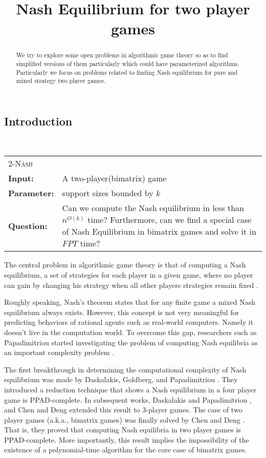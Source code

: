 \documentclass{article}
\newcommand{\defproblem}[4]{%
  \hfill\\\smallskip\noindent%
  \begin{tabularx}{\textwidth}{|l X|}%
    \hline%
    \multicolumn{2}{|l|}{\pname{#1}}\\%
    \textbf{Input:}&#2\\%
    \textbf{Parameter:}&#3\\%
    \textbf{Question:}&#4\smallskip\\\hline%
  \end{tabularx}%
  \smallskip%
}%
\newcommand{\pname}[1]{\textnormal{\textsc{#1}}}
\begin{document}
\title{Nash Equilibrium for two player games}
\date{}
\maketitle



\begin{abstract}
We try to explore some open problems in algorithmic game theory so as to find simplified versions of them particularly which could have parameterized algorithms. Particularly we focus on problems related to finding Nash equilibrium for pure and mixed strategy two player games.

\end{abstract}

\subsection*{Introduction}

\defproblem{$2$-Nash}
%
{A two-player(bimatrix) game}
%
{support sizes bounded by $k$}
%
{Can we compute the Nash equilibrium in less than $n^{O(k)}$ time? Furthermore, can we find a special case of Nash Equilibrium in bimatrix games and solve it in $FPT$ time?}
%

The central problem in algorithmic game theory is that of computing a Nash
equilibrium, a set of strategies for each player in a given game, where no player
can gain by changing his strategy when all other players strategies remain fixed \cite{hermelin2013parameterized}.

Roughly speaking, Nash's theorem states that for any finite game a mixed Nash equilibrium always exists. However, this concept is not very meaningful for predicting behaviors of rational agents such as real-world computers. Namely it doesn't live in the computation world. To overcome this gap, researchers such as Papadimitriou started investigating the problem of computing Nash equilibria as an important complexity problem \cite{papadimitriou2001algorithms}.

The first breakthrough in determining the computational complexity of Nash equilibrium was made by Daskalakis, Goldberg, and Papadimitriou \cite{daskalakis2009complexity,goldberg2006reducibility}. They introduced a reduction technique that shows a Nash equilibrium in a four player game is PPAD-complete. In subsequent works, Daskalakis and Papadimitriou \cite{daskalakis2005three}, and Chen and Deng \cite{chen20053} extended this result to 3-player games. The case of two player games (a.k.a., bimatrix games) was finally solved by Chen and Deng \cite{chen2006settling}. That is, they proved that computing Nash equilibria in two player games is PPAD-complete. More importantly, this result implies the impossibility of the existence of a polynomial-time algorithm for the core case of bimatrix games.
\end{document}
